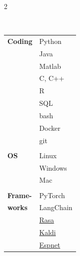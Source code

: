 \documentclass[pastel]{hipstercv}
\newlength{\leftcolwidth}
\begin{document}
\begin{paracol}{2}
{\hspace{-0.7cm}\\
\begin{minipage}[t]{\leftcolwidth}%
\vspace{0.2em}
\hspace{-1.1em}\begin{tabular}{l | l}
    \textbf{Coding} & Python\\[1pt]
    \textbf{} & Java\\[1pt]
    \textbf{} & Matlab\\[1pt]
    \textbf{} & C, C++\\[1pt] %
    \textbf{} & R\\[1pt]
    & SQL\\[1pt]
    \textbf{} & bash\\[1pt]
    \textbf{} & Docker\\[1pt]
    \textbf{} & git\\[1pt]
    \textbf{} & \\[1pt]
    \textbf{OS} & Linux\\[1pt]%
    \textbf{} & Windows\\[1pt]
    \textbf{} & Mac\\[1pt]
    \textbf{} & \\[1pt]
    \textbf{Frame-} & PyTorch\\[1pt]
    \textbf{works} & LangChain\\[1pt]
    \textbf{} & \href{https://rasa.com/}{Rasa}\\[1pt]
    \textbf{} & \href{https://github.com/kaldi-asr/kaldi}{Kaldi}\\[1pt] %
    \textbf{} & \href{https://espnet.github.io/espnet/}{Espnet}\\[1pt]
\end{tabular}

\vspace{5em}

\hspace{-0.7cm}
\\


\end{minipage}}
\end{paracol}
\end{document}
